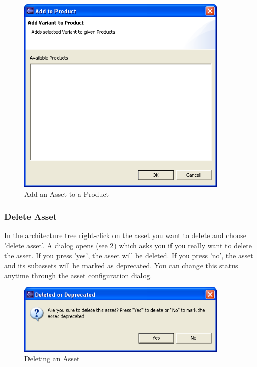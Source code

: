 \begin{figure}[h!]
\begin{center}
\includegraphics[width=10cm]{addtoproduct.png}
   \caption{Add an Asset to a Product}
\label{addproduct}
\end{center}
\end{figure}\par


\subsubsection{Delete Asset}
In the architecture tree right-click on the asset you want to delete and choose
'delete asset'. A dialog opens (see \ref{delete}) which asks you if you really want to delete the asset.
If you press 'yes', the asset will be deleted. If you press 'no', the asset and its
subassets will
be marked as deprecated. You can change this status anytime through the asset 
configuration dialog. 


\begin{figure}[h!]
\begin{center}
\includegraphics[width=10cm]{deleteasset.png}
   \caption{Deleting an Asset}
\label{delete}
\end{center}
\end{figure}\par

